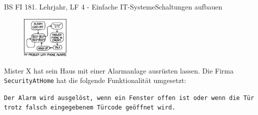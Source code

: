 \documentclass[oneside,openany,headings=optiontotoc,11pt,numbers=noenddot]{scrreprt}
\begin{document}
	\begin{worksheet}{BS FI 18}{1. Lehrjahr, LF 4 - Einfache IT-Systeme}{Schaltungen aufbauen}
		\begin{framed}
			\noindent
			\begin{figure}
				\includegraphics[width=0.2\textwidth,align=t]{../99_Bilder/alarm.png}
			\end{figure}
			\par\noindent
			Mister X hat sein Haus mit einer Alarmanlage ausrüsten lassen. Die Firma \texttt{SecurityAtHome} hat die folgende Funktionalität umgesetzt:
			\par
			\begin{addmargin}[0.75cm]{0cm}
				\texttt{Der Alarm wird ausgelöst, wenn ein Fenster offen ist oder wenn die Tür trotz falsch eingegebenem Türcode geöffnet wird.}\\
			\end{addmargin}
		\end{framed}
		\begin{framed}
			

\end{framed}
\end{worksheet}
\end{document}
